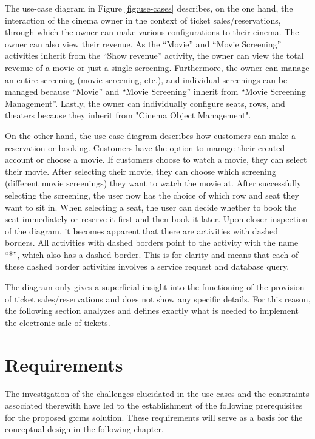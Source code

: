 The use-case diagram in Figure \ref{fig:use-cases} describes, on the one hand, the interaction of the cinema owner in the context of ticket sales/reservations, through which the owner can make various configurations to their cinema. The owner can also view their revenue. As the \enquote{Movie} and \enquote{Movie Screening} activities inherit from the \enquote{Show revenue} activity, the owner can view the total revenue of a movie or just a single screening. Furthermore, the owner can manage an entire screening (movie screening, etc.), and individual screenings can be managed because \enquote{Movie} and \enquote{Movie Screening} inherit from \enquote{Movie Screening Management}. Lastly, the owner can individually configure seats, rows, and theaters because they inherit from "Cinema Object Management".

On the other hand, the use-case diagram describes how customers can make a reservation or booking. Customers have the option to manage their created account or choose a movie. If customers choose to watch a movie, they can select their movie. After selecting their movie, they can choose which screening (different movie screenings) they want to watch the movie at. After successfully selecting the screening, the user now has the choice of which row and seat they want to sit in. When selecting a seat, the user can decide whether to book the seat immediately or reserve it first and then book it later. Upon closer inspection of the diagram, it becomes apparent that there are activities with dashed borders. All activities with dashed borders point to the activity with the name \enquote{*}, which also has a dashed border. This is for clarity and means that each of these dashed border activities involves a service request and database query.

The diagram only gives a superficial insight into the functioning of the provision of ticket sales/reservations and does not show any specific details. For this reason, the following section analyzes and defines exactly what is needed to implement the electronic sale of tickets.

\pagebreak

\section{Requirements}
\label{sec:requirements}

The investigation of the challenges elucidated in the use cases and the constraints associated therewith have led to the establishment of the following prerequisites for the proposed \gls{g:cms} solution. These requirements will serve as a basis for the conceptual design in the following chapter.

